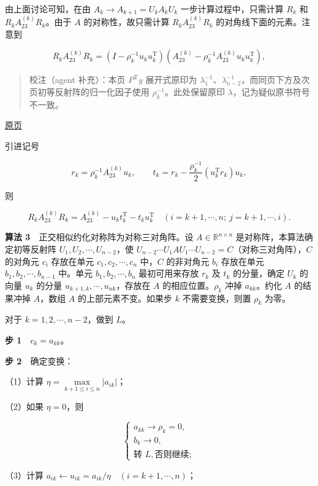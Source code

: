 \documentclass[
  10pt,
  fontset=fandol]{ctexart}
\begin{document}
由上面讨论可知，在由 \(A_k\to A_{k+1}=U_kA_kU_k\) 一步计算过程中，只需计算 \(R_k\) 和 \(R_kA_{23}^{(k)}R_k\)。由于 \(A\) 的对称性，故只需计算 \(R_kA_{23}^{(k)}R_k\) 的对角线下面的元素。注意到

\[
R_kA_{23}^{(k)}R_k=(I-\rho_k^{-1}u_ku_k^{\mathrm T})(A_{23}^{(k)}-\rho_k^{-1}A_{23}^{(k)}u_ku_k^{\mathrm T}),
\]

\begin{quote}
校注（agent 补充）：本页 \(P^{\mathrm T}y\) 展开式原印为 \(\lambda_1^{-1}\)、\(\lambda_{n-2}^{-1}\)，而同页下方及次页初等反射阵的归一化因子使用 \(\rho_k^{-1}\)。此处保留原印 \(\lambda\)，记为疑似原书符号不一致。
\end{quote}

\href{../../source-images/pdf-248.jpeg}{原页}

引进记号

\[
r_k=\rho_k^{-1}A_{23}^{(k)}u_k,\qquad
 t_k=r_k-\frac{\rho_k^{-1}}2(u_k^{\mathrm T}r_k)u_k,
\]

则

\[
R_kA_{23}^{(k)}R_k=A_{23}^{(k)}-u_kt_k^{\mathrm T}-t_ku_k^{\mathrm T}
\quad(i=k+1,\cdots,n;\ j=k+1,\cdots,i).
\]

\textbf{算法 3}　正交相似约化对称阵为对称三对角阵。设 \(A\in\mathbb R^{n\times n}\) 是对称阵，本算法确定初等反射阵 \(U_1,U_2,\cdots,U_{n-2}\)，使 \(U_{n-2}\cdots U_1AU_1\cdots U_{n-2}=C\)（对称三对角阵），\(C\) 的对角元 \(c_i\) 存放在单元 \(c_1,c_2,\cdots,c_n\) 中，\(C\) 的非对角元 \(b_i\) 存放在单元 \(b_1,b_2,\cdots,b_{n-1}\) 中。单元 \(b_1,b_2,\cdots,b_n\) 最初可用来存放 \(r_k\) 及 \(t_k\) 的分量，确定 \(U_k\) 的向量 \(u_k\) 的分量 \(u_{k+1,k},\cdots,u_{nk}\)，存放在 \(A\) 的相应位置。\(\rho_k\) 冲掉 \(a_{kk}\)。约化 \(A\) 的结果冲掉 \(A\)，数组 \(A\) 的上部元素不变。如果步 \(k\) 不需要变换，则置 \(\rho_k\) 为零。

对于 \(k=1,2,\cdots,n-2\)，做到 \(L\)。

\textbf{步 1}　\(c_k=a_{kk}\)。

\textbf{步 2}　确定变换：

（1）计算 \(\eta=\max\limits_{k+1\leq i\leq n}|a_{ik}|\)；

（2）如果 \(\eta=0\)，则

\[
\begin{cases}
a_{kk}\to\rho_k=0,\\
b_k\to0,\\
\text{转 }L,\text{否则继续};
\end{cases}
\]

（3）计算 \(a_{ik}\leftarrow u_{ik}=a_{ik}/\eta\quad(i=k+1,\cdots,n)\)；
\end{document}

